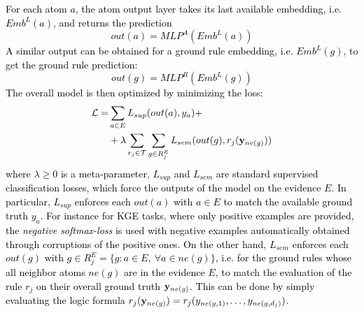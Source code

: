 \documentclass[journal]{IEEEtran}
\newcommand{\mc}{\mathcal}
\newcommand{\ar}[1]{\textcolor{black}{#1}}
\begin{document}
\ar{For each atom $a$, the atom output layer takes its last available embedding, i.e. $Emb^{L}(a)$, and returns the prediction
\[
out(a) = MLP^{A}(Emb^{L}(a))
\]
A similar output can be obtained for a ground rule embedding, i.e. $Emb^{L}(g)$, to get the ground rule prediction:
\[
out(g) = MLP^{R}(Emb^{L}(g))
\]
The overall model is then optimized by minimizing the loss:
\begin{align}
    \mathcal{L} = & \sum_{a \in E} L_{sup}(out(a), y_a)+  \\
     & + \lambda \sum_{r_j\in\mc{T}} \sum_{g \in R_j^E} L_{sem}(out(g), r_j({\bf y}_{ne(g)}))
     \label{eq:losssem}
\end{align}
where $\lambda \ge 0$ is a meta-parameter, $L_{sup}$ and $L_{sem}$ are standard supervised classification losses, which force the outputs of the model on the evidence $E$. In particular, $L_{sup}$ enforces each $out(a)$ with $a \in E$ to match the available ground truth $y_a$. For instance for KGE tasks, where only positive examples are provided, the \emph{negative softmax-loss} is used with negative examples automatically obtained through corruptions of the positive ones. On the other hand, $L_{sem}$ enforces each $out(g)$ with $g\in R_j^E=\{g: a \in E,\ \forall a \in ne(g)\}$, i.e. for the ground rules whose all neighbor atoms $ne(g)$ are in the evidence $E$, to match the evaluation of the rule $r_j$ on their overall ground truth ${\bf y}_{ne(g)}$. This can be done by simply evaluating the logic formula $r_j({\bf y}_{ne(g)}) = r_j(y_{ne(g,1)}, \ldots, y_{ne(g,d_j)})$.}
\end{document}
